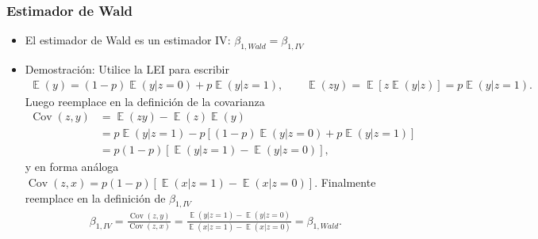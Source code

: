 \documentclass[t, compress, spanish, aspectratio=169]{beamer}
\DeclareMathOperator{\Cov}{Cov}
\DeclareMathOperator{\E}{\mathbb{E}}
\begin{document}
	\begin{frame}
		\frametitle{Estimador de Wald}
		\begin{itemize}
			\item  \alert{El estimador de Wald es un estimador IV}: $\beta_{1,Wald}=\beta_{1,IV}$
			\item  [] Demostraci\'on: Utilice la LEI para escribir
			\small
			\begin{align*}
				\E(y) = (1-p) \E(y|z=0)+ p \E(y|z=1), \qquad \E(zy) = \E[z\E(y|z)]= p \E(y|z=1).
			\end{align*}
			Luego reemplace en la definici\'on de la covarianza
			\begin{align*}
				\Cov(z,y) &= \E(zy) - \E(z)\E(y) \\
				&= p \E(y|z=1) - p[(1-p) \E(y|z=0)+ p \E(y|z=1)] \\
			 	&= p(1-p)[\E(y|z=1)-\E(y|z=0)],
			\end{align*}
			y en forma an\'aloga $\Cov(z,x)=p(1-p)[\E(x|z=1)-\E(x|z=0)]$. Finalmente reemplace en la definici\'on de $\beta_{1,IV}$
			\begin{align*}
				\beta_{1,IV}=\frac{\Cov(z,y)}{\Cov(z,x)}=\frac{\E(y|z=1)-\E(y|z=0)}{\E(x|z=1)-\E(x|z=0)}=\beta_{1,Wald}.
			\end{align*}
		\end{itemize}
	\end{frame}
\end{document}
